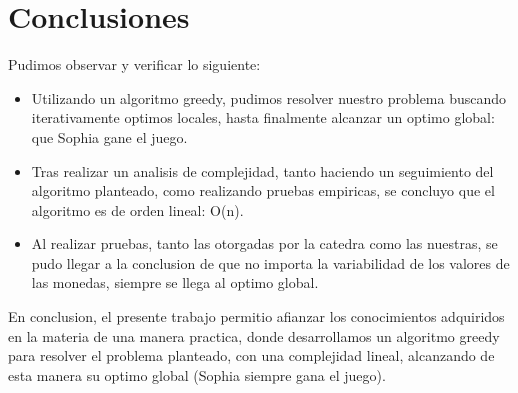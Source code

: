 \section{Conclusiones}

Pudimos observar y verificar lo siguiente:

\begin{itemize}

\item Utilizando un algoritmo greedy, pudimos resolver nuestro problema buscando iterativamente optimos locales, hasta finalmente alcanzar un optimo global: que Sophia gane el juego.
\item Tras realizar un analisis de complejidad, tanto haciendo un seguimiento del algoritmo planteado, como realizando pruebas empiricas, se concluyo que el algoritmo es de orden lineal: O(n).
\item Al realizar pruebas, tanto las otorgadas por la catedra como las nuestras, se pudo llegar a la conclusion de que no importa la variabilidad de los valores de las monedas, siempre se llega al optimo global.

\end {itemize}

En conclusion, el presente trabajo permitio afianzar los conocimientos adquiridos en la materia de una manera practica, donde desarrollamos un algoritmo greedy para resolver el problema planteado, con una complejidad lineal, alcanzando de esta manera su optimo global (Sophia siempre gana el juego). 